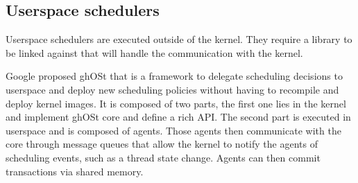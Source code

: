 \subsection{Userspace schedulers}
\par Userspace schedulers are executed outside of the kernel. They require a library to be linked against that will handle the communication with the kernel. \\
\par Google proposed ghOSt\cite{ghost} that is a framework to delegate scheduling decisions to userspace and deploy new scheduling policies without having to recompile and deploy kernel images. It is composed of two parts, the first one lies in the kernel and implement ghOSt core and define a rich API. The second part is executed in userspace and is composed of agents. Those agents then communicate with the core through message queues that allow the kernel to notify the agents of scheduling events, such as a thread state change. Agents can then commit transactions via shared memory. 




